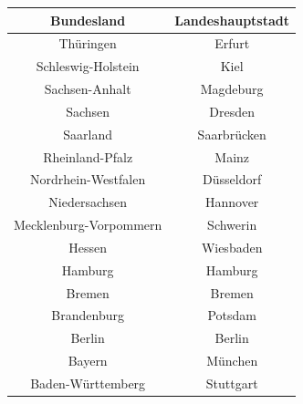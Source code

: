 \documentclass[conference]{IEEEtran}
\begin{document}
	\begin{tabular}{|c|c|}
		\hline
		\textbf{Bundesland} & \textbf{Landeshauptstadt}\\
		\hline
		Thüringen & Erfurt\\
		\hline
		Schleswig-Holstein & Kiel\\
		\hline
		Sachsen-Anhalt & Magdeburg\\
		\hline
		Sachsen & Dresden\\
		\hline
		Saarland & Saarbrücken\\
		\hline
		Rheinland-Pfalz & Mainz\\
		\hline
		Nordrhein-Westfalen & Düsseldorf\\
		\hline
		Niedersachsen & Hannover\\
		\hline
		Mecklenburg-Vorpommern & Schwerin\\
		\hline
		Hessen & Wiesbaden\\
		\hline
		Hamburg & Hamburg\\
		\hline
		Bremen & Bremen\\
		\hline
		Brandenburg & Potsdam\\
		\hline
		Berlin & Berlin\\
		\hline
		Bayern & München\\
		\hline
		Baden-Württemberg & Stuttgart\\
		\hline
	\end{tabular}
	
	
\end{document}

